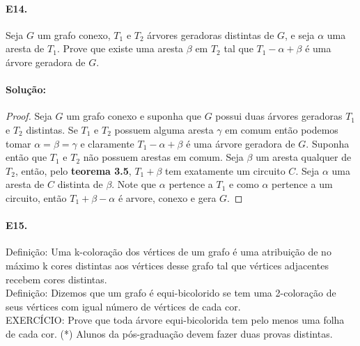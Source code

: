 \documentclass[11pt,a4paper,notitlepage]{exam}
\begin{document}
\paragraph{E14.} Seja $G$ um grafo conexo, $T_1$ e $T_2$ árvores geradoras distintas de $G$, e seja $\alpha$ uma aresta de $T_1$. Prove que existe uma aresta $\beta$ em $T_2$ tal que $T_1 - \alpha + \beta$ é uma árvore geradora de $G$.
\paragraph{Solução:}
\begin{proof}
  Seja $G$ um grafo conexo e suponha que $G$ possui duas árvores geradoras $T_1$ e $T_2$ distintas.
  Se $T_1$ e $T_2$ possuem alguma aresta $\gamma$ em comum então podemos tomar $\alpha = \beta = \gamma$ e claramente $T_1 -\alpha + \beta$ é uma árvore geradora de $G$. Suponha então que $T_1$ e $T_2$ não possuem arestas em comum. Seja $\beta$ um aresta qualquer de $T_2$, então, pelo \textbf{teorema 3.5}, $T_1 + \beta$ tem exatamente um circuito $C$. Seja $\alpha$ uma aresta de $C$ distinta de $\beta$. Note que $\alpha$ pertence a $T_1$ e como $\alpha$ pertence a um circuito, então $T_1 +\beta -\alpha$ é arvore, conexo e gera $G$.
\end{proof}
\paragraph{E15.} Definição: Uma k-coloração dos vértices de um grafo é uma atribuição de no máximo k cores distintas aos vértices desse grafo tal que vértices adjacentes recebem cores distintas.\\


Definição: Dizemos que um grafo é equi-bicolorido se tem uma 2-coloração de seus vértices
com igual número de vértices de cada cor.\\


EXERCÍCIO: Prove que toda árvore equi-bicolorida tem pelo menos uma folha de cada cor.
(*) Alunos da pós-graduação devem fazer duas provas distintas.
\end{document}
